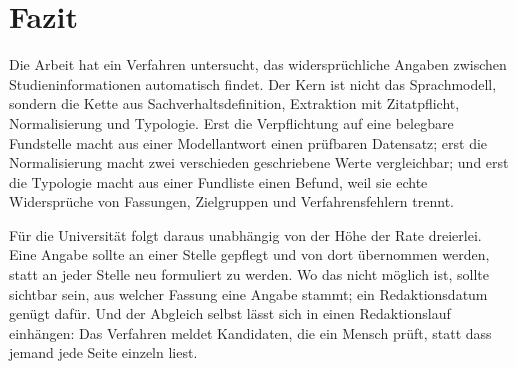 
\section{Fazit}
\label{sec:fazit}

Die Arbeit hat ein Verfahren untersucht, das widersprüchliche Angaben zwischen
Studieninformationen automatisch findet. Der Kern ist nicht das Sprachmodell, sondern die
Kette aus Sachverhaltsdefinition, Extraktion mit Zitatpflicht, Normalisierung und Typologie.
Erst die Verpflichtung auf eine belegbare Fundstelle macht aus einer Modellantwort einen
prüfbaren Datensatz; erst die Normalisierung macht zwei verschieden geschriebene Werte
vergleichbar; und erst die Typologie macht aus einer Fundliste einen Befund, weil sie echte
Widersprüche von Fassungen, Zielgruppen und Verfahrensfehlern trennt.


Für die Universität folgt daraus unabhängig von der Höhe der Rate dreierlei. Eine Angabe
sollte an einer Stelle gepflegt und von dort übernommen werden, statt an jeder Stelle neu
formuliert zu werden. Wo das nicht möglich ist, sollte sichtbar sein, aus welcher Fassung
eine Angabe stammt; ein Redaktionsdatum genügt dafür. Und der Abgleich selbst lässt sich in
einen Redaktionslauf einhängen: Das Verfahren meldet Kandidaten, die ein Mensch prüft, statt
dass jemand jede Seite einzeln liest.
